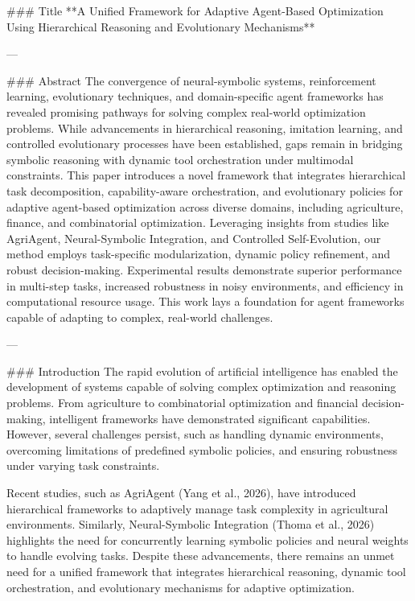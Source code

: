 ### Title
**A Unified Framework for Adaptive Agent-Based Optimization Using Hierarchical Reasoning and Evolutionary Mechanisms**

---

### Abstract
The convergence of neural-symbolic systems, reinforcement learning, evolutionary techniques, and domain-specific agent frameworks has revealed promising pathways for solving complex real-world optimization problems. While advancements in hierarchical reasoning, imitation learning, and controlled evolutionary processes have been established, gaps remain in bridging symbolic reasoning with dynamic tool orchestration under multimodal constraints. This paper introduces a novel framework that integrates hierarchical task decomposition, capability-aware orchestration, and evolutionary policies for adaptive agent-based optimization across diverse domains, including agriculture, finance, and combinatorial optimization. Leveraging insights from studies like AgriAgent, Neural-Symbolic Integration, and Controlled Self-Evolution, our method employs task-specific modularization, dynamic policy refinement, and robust decision-making. Experimental results demonstrate superior performance in multi-step tasks, increased robustness in noisy environments, and efficiency in computational resource usage. This work lays a foundation for agent frameworks capable of adapting to complex, real-world challenges.

---

### Introduction
The rapid evolution of artificial intelligence has enabled the development of systems capable of solving complex optimization and reasoning problems. From agriculture to combinatorial optimization and financial decision-making, intelligent frameworks have demonstrated significant capabilities. However, several challenges persist, such as handling dynamic environments, overcoming limitations of predefined symbolic policies, and ensuring robustness under varying task constraints.

Recent studies, such as AgriAgent (Yang et al., 2026), have introduced hierarchical frameworks to adaptively manage task complexity in agricultural environments. Similarly, Neural-Symbolic Integration (Thoma et al., 2026) highlights the need for concurrently learning symbolic policies and neural weights to handle evolving tasks. Despite these advancements, there remains an unmet need for a unified framework that integrates hierarchical reasoning, dynamic tool orchestration, and evolutionary mechanisms for adaptive optimization.

